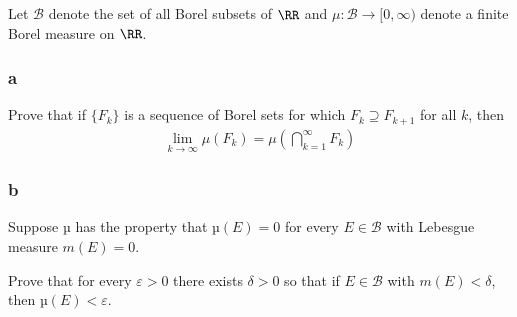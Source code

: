 Let \(\mathcal B\) denote the set of all Borel subsets of \(\RR\) and
\(\mu : \mathcal B → [0, \infty)\) denote a finite Borel measure on
\(\RR\).

\hypertarget{a-6}{%
\subsubsection{a}\label{a-6}}

Prove that if \(\{F_k\}\) is a sequence of Borel sets for which
\(F_k \supseteq F_{k+1}\) for all \(k\), then
\begin{align*}
\lim _{k \rightarrow \infty} \mu\left(F_{k}\right)=\mu\left(\bigcap_{k=1}^{\infty} F_{k}\right)
\end{align*}

\hypertarget{b-6}{%
\subsubsection{b}\label{b-6}}

Suppose \(µ\) has the property that \(µ(E) = 0\) for every
\(E \in \mathcal B\) with Lebesgue measure \(m(E) = 0\).

Prove that for every \(ε > 0\) there exists \(δ > 0\) so that if
\(E \in \mathcal B\) with \(m(E) < δ\), then \(µ(E) < ε\).

